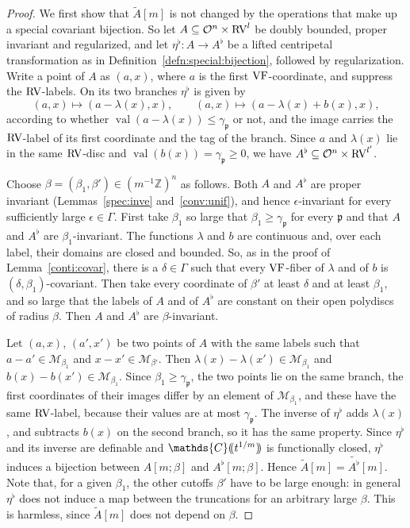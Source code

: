 \documentclass[12pt]{amsart}
\theoremstyle{plain}
\theoremstyle{definition}
\theoremstyle{remark}
\numberwithin{equation}{section}
\theoremstyle{plain}
\newcommand{\VF}{\textup{VF}}
\newcommand{\RV}{\textup{RV}}
\newcommand{\MM}{\mdl M}
\newcommand{\OO}{\mdl O}
\newcommand{\Z}{\mathds{Z}}
\newcommand{\C}{\mathds{C}}
\newcommand{\gp}{\mathfrak{p}}
\newcommand{\0}{\emptyset}
\newcommand{\dpar}[1]{%
   (\mkern-4mu (#1 )\mkern-4mu )}
\newcommand{\mdl}[1]{\mathcal{#1}}  %
\newcommand{\fun}{\longrightarrow}
\newcommand{\efun}{\longmapsto}
\newcommand{\sub}{\subseteq}
\DeclareMathOperator{\vv}{val}
\begin{document}
\begin{proof}
We first show that $\tilde A[m]$ is not changed by the operations that make up a special covariant bijection. So let $A \sub \OO^n \times \RV^l$ be doubly bounded, proper invariant and regularized, and let $\eta^\flat : A \fun A^\flat$ be a lifted centripetal transformation as in Definition~\ref{defn:special:bijection}, followed by regularization. Write a point of $A$ as $(a, x)$, where $a$ is the first $\VF$-coordinate, and suppress the $\RV$-labels. On its two branches $\eta^\flat$ is given by
\[
(a, x) \efun (a - \lambda(x), x), \qquad (a, x) \efun (a - \lambda(x) + b(x), x),
\]
according to whether $\vv(a - \lambda(x)) \leq \gamma_\gp$ or not, and the image carries the $\RV$-label of its first coordinate and the tag of the branch. Since $a$ and $\lambda(x)$ lie in the same $\RV$-disc and $\vv(b(x)) = \gamma_\gp \geq 0$, we have $A^\flat \sub \OO^n \times \RV^{l'}$.

Choose $\beta = (\beta_1, \beta') \in (m^{-1}\Z)^n$ as follows. Both $A$ and $A^\flat$ are proper invariant (Lemmas~\ref{spec:inve} and~\ref{conv:unif}), and hence $\epsilon$-invariant for every sufficiently large $\epsilon \in \Gamma$. First take $\beta_1$ so large that $\beta_1 \geq \gamma_\gp$ for every $\gp$ and that $A$ and $A^\flat$ are $\beta_1$-invariant. The functions $\lambda$ and $b$ are continuous and, over each label, their domains are closed and bounded. So, as in the proof of Lemma~\ref{conti:covar}, there is a $\delta \in \Gamma$ such that every $\VF$-fiber of $\lambda$ and of $b$ is $(\delta, \beta_1)$-covariant. Then take every coordinate of $\beta'$ at least $\delta$ and at least $\beta_1$, and so large that the labels of $A$ and of $A^\flat$ are constant on their open polydiscs of radius $\beta$. Then $A$ and $A^\flat$ are $\beta$-invariant.

Let $(a, x)$, $(a', x')$ be two points of $A$ with the same labels such that $a - a' \in \MM_{\beta_1}$ and $x - x' \in \MM_{\beta'}$. Then $\lambda(x) - \lambda(x') \in \MM_{\beta_1}$ and $b(x) - b(x') \in \MM_{\beta_1}$. Since $\beta_1 \geq \gamma_\gp$, the two points lie on the same branch, the first coordinates of their images differ by an element of $\MM_{\beta_1}$, and these have the same $\RV$-label, because their values are at most $\gamma_\gp$. The inverse of $\eta^\flat$ adds $\lambda(x)$, and subtracts $b(x)$ on the second branch, so it has the same property. Since $\eta^\flat$ and its inverse are definable and $\C \dpar{t^{1/m}}$ is functionally closed, $\eta^\flat$ induces a bijection between $A[m;\beta]$ and $A^\flat[m;\beta]$. Hence $\tilde A[m] = \widetilde{A^\flat}[m]$. Note that, for a given $\beta_1$, the other cutoffs $\beta'$ have to be large enough: in general $\eta^\flat$ does not induce a map between the truncations for an arbitrary large $\beta$. This is harmless, since $\tilde A[m]$ does not depend on $\beta$.


\end{proof}
\end{document}
